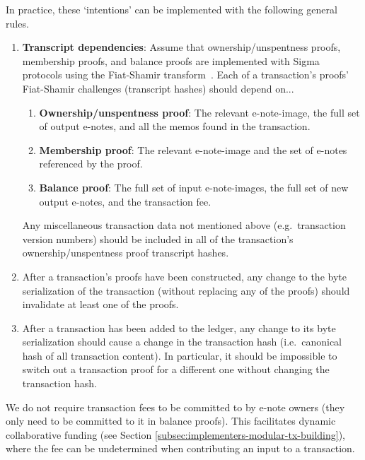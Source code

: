 In practice, these `intentions' can be implemented with the following general rules.

\begin{enumerate}
    \item \textbf{Transcript dependencies}: Assume that ownership/unspentness proofs, membership proofs, and balance proofs are implemented with Sigma protocols using the Fiat-Shamir transform~\cite{fiat-shamir-transform}. Each of a transaction's proofs' Fiat-Shamir challenges (transcript hashes) should depend on...

    \begin{enumerate}
        \item \textbf{Ownership/unspentness proof}: The relevant e-note-image, the full set of output e-notes, and all the memos found in the transaction.
        \item \textbf{Membership proof}: The relevant e-note-image and the set of e-notes referenced by the proof.
        \item \textbf{Balance proof}: The full set of input e-note-images, the full set of new output e-notes, and the transaction fee.
    \end{enumerate}

    Any miscellaneous transaction data not mentioned above (e.g.\ transaction version numbers) should be included in all of the transaction's ownership/unspentness proof transcript hashes.

    \item After a transaction's proofs have been constructed, any change to the byte serialization of the transaction (without replacing any of the proofs) should invalidate at least one of the proofs.

    \item After a transaction has been added to the ledger, any change to its byte serialization should cause a change in the transaction hash (i.e.\ canonical hash of all transaction content). In particular, it should be impossible to switch out a transaction proof for a different one without changing the transaction hash.
\end{enumerate}

We do not require transaction fees to be committed to by e-note owners (they only need to be committed to it in balance proofs). This facilitates dynamic collaborative funding (see Section \ref{subsec:implementers-modular-tx-building}), where the fee can be undetermined when contributing an input to a transaction.

